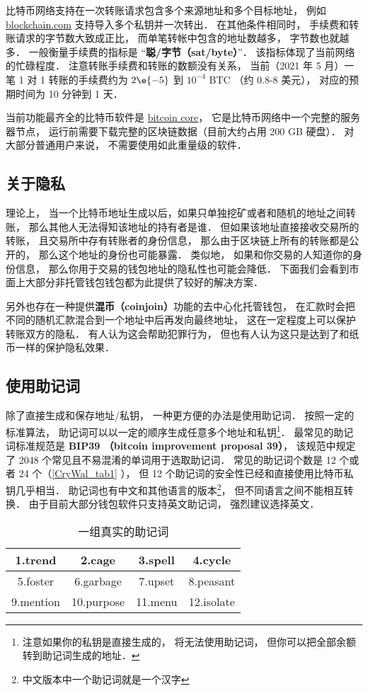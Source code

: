 比特币网络支持在一次转账请求包含多个来源地址和多个目标地址， 例如 \href{https://blockchain.com}{blockchain.com} 支持导入多个私钥并一次转出． 在其他条件相同时， 手续费和转账请求的字节数大致成正比， 而单笔转帐中包含的地址数越多， 字节数也就越多． 一般衡量手续费的指标是 “\textbf{聪/字节（sat/byte）}”． 该指标体现了当前网络的忙碌程度． 注意转账手续费和转账的数额没有关系， 当前（2021 年 5 月）一笔 1 对 1 转账的手续费约为 $2\e{-5}$ 到 $10^{-4}$ BTC （约 0.8-8 美元）， 对应的预期时间为 10 分钟到 1 天．

当前功能最齐全的比特币软件是 \href{https://bitcoin.org/en/bitcoin-core/}{bitcoin core}， 它是比特币网络中一个完整的服务器节点， 运行前需要下载完整的区块链数据（目前大约占用 200 GB 硬盘）． 对大部分普通用户来说， 不需要使用如此重量级的软件．

\subsection{关于隐私}
理论上， 当一个比特币地址生成以后，如果只单独挖矿或者和随机的地址之间转账， 那么其他人无法得知该地址的持有者是谁． 但如果该地址直接接收交易所的转账， 且交易所中存有转账者的身份信息， 那么由于区块链上所有的转账都是公开的， 那么这个地址的身份也可能暴露． 类似地， 如果和你交易的人知道你的身份信息， 那么你用于交易的钱包地址的隐私性也可能会降低． 下面我们会看到市面上大部分非托管钱包钱包都为此提供了较好的解决方案．

另外也存在一种提供\textbf{混币（coinjoin）}功能的去中心化托管钱包， 在汇款时会把不同的随机汇款混合到一个地址中后再发向最终地址， 这在一定程度上可以保护转账双方的隐私． 有人认为这会帮助犯罪行为， 但也有人认为这只是达到了和纸币一样的保护隐私效果．

\subsection{使用助记词}
除了直接生成和保存地址/私钥， 一种更方便的办法是使用助记词． 按照一定的标准算法， 助记词可以以一定的顺序生成任意多个地址和私钥\footnote{注意如果你的私钥是直接生成的， 将无法使用助记词， 但你可以把全部余额转到助记词生成的地址．}． 最常见的助记词标准规范是 \textbf{BIP39 （bitcoin improvement proposal 39）}， 该规范中规定了 2048 个常见且不易混淆的单词用于选取助记词． 常见的助记词个数是 12 个或者 24 个（\autoref{CryWal_tab1} ）， 但 12 个助记词的安全性已经和直接使用比特币私钥几乎相当． 助记词也有中文和其他语言的版本\footnote{中文版本中一个助记词就是一个汉字}， 但不同语言之间不能相互转换． 由于目前大部分钱包软件只支持英文助记词， 强烈建议选择英文．
\begin{table}[ht]
\centering
\caption{一组真实的助记词}\label{CryWal_tab1}
\begin{tabular}{|c|c|c|c|}
\hline
1.trend & 2.cage & 3.spell & 4.cycle \\
\hline
5.foster & 6.garbage & 7.upset & 8.peasant \\
\hline
9.mention & 10.purpose & 11.menu & 12.isolate \\
\hline
\end{tabular}
\end{table}

